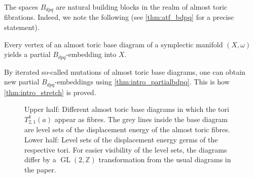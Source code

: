 \documentclass[12pt,a4paper,abstract=true,draft]{scrartcl}
\DeclareMathOperator{\GL}{GL}
\begin{document}
The spaces $B_{dpq}$ are natural building blocks in the realm of almost toric fibrations.
Indeed, we note the following (see \cref{thm:atf_bdpq} for a precise statement).

\begin{proposition}
    \label{thm:intro_partialbdpq}
    Every vertex of an almost toric base diagram of a symplectic manifold $(X,\omega)$ yields a partial $B_{dpq}$-embedding into $X$. 
\end{proposition}

By iterated so-called mutations of almost toric base diagrams, one can obtain new partial $B_{dpq}$-embeddings using \cref{thm:intro_partialbdpq}.
This is how \cref{thm:intro_stretch} is proved.

\begin{figure}
    \centering
    \caption{Upper half: Different almost toric base diagrams in which the tori $T^k_{2,1}(a)$ appear as fibres. The grey lines inside the base diagram are level sets of the displacement energy of the almost toric fibres. Lower half: Level sets of the displacement energy germs of the respective tori. 
    For easier visibility of the  level sets, the diagrams differ by a $\GL(2,ℤ)$ transformation from the usual diagrams in the paper.}
    \label{fig:germ_examples}
\end{figure}
\end{document}
